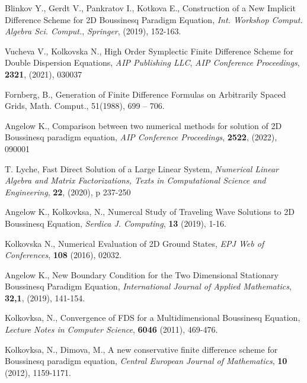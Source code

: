 \documentclass[a5paper]{article}
\theoremstyle{remark}
\begin{document}
\begin{large}
\begin{thebibliography}{99}
	 Blinkov Y., Gerdt V., Pankratov I., Kotkova E., Construction of a New Implicit Difference Scheme for 2D Boussinesq Paradigm Equation, {\it Int. Workshop Comput. Algebra Sci. Comput.}, \emph{Springer}, (2019), 152-163.

	 Vucheva V., Kolkovska N., High Order Symplectic Finite Difference Scheme for Double Dispersion Equations, {\it AIP Publishing LLC}, \emph{AIP Conference Proceedings}, \textbf{2321}, (2021), 030037

	 Fornberg, B., Generation of Finite Difference Formulas on Arbitrarily Spaced Grids, 
Math. Comput., 51(1988),  699 -- 706.

	 Angelow K., Comparison between two numerical methods for solution of 2D Boussinesq paradigm equation, \emph{AIP Conference Proceedings}, \textbf{2522}, (2022), 090001

	 T. Lyche, Fast Direct Solution of a Large Linear System,
{\it Numerical Linear Algebra and Matrix Factorizations, Texts in Computational Science and Engineering}, \textbf{22}, (2020), p 237-250

	 Angelow K., Kolkovksa, N., Numercal Study of Traveling Wave Solutions to 2D Boussinesq Equation, {\it Serdica J. Computing}, \textbf{13} (2019), 1-16.

	 Kolkovska N., Numerical Evaluation of 2D Ground States,
\emph{ EPJ Web of Conferences}, \textbf{108} (2016), 02032.

	 Angelow K., New Boundary Condition for the Two Dimensional Stationary Boussinesq Paradigm Equation, 
{\it International Journal of Applied Mathematics}, \textbf{32,1}, (2019), 141-154.

	 Kolkovksa, N., Convergence of FDS for a Multidimensional Boussinesq Equation, {\it Lecture Notes in Computer Science}, \textbf{6046} (2011), 469-476.

	 Kolkovksa, N., Dimova, M., A new conservative finite difference scheme for Boussinesq paradigm equation, {\it Central European Journal of Mathematics}, \textbf{10} (2012), 1159-1171.

\end{thebibliography}

\end{large}
\end{document}
